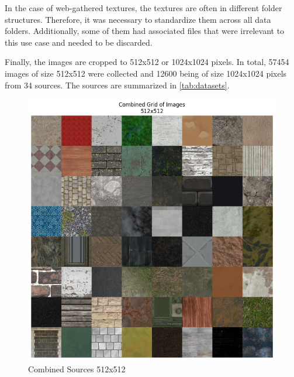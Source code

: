     In the case of web-gathered textures, the textures are often in different folder structures. Therefore, it was necessary to standardize them across all data folders. Additionally, some of them had associated files that were irrelevant to this use case and needed to be discarded.

    Finally, the images are cropped to 512x512 or 1024x1024 pixels. In total, 57454 images of size 512x512 were collected and 12600 being of size 1024x1024 pixels from 34 sources. The sources are summarized in \autoref{tab:datasets}.


    \begin{figure}[H]
        \centering
        \begin{minipage}{.50\textwidth}
            \centering
            \includegraphics[width=\linewidth]{../code/dataAnalysis/plots/exampleImgs/DataCombined512x.png}
            \caption{Combined Sources 512x512}
            \label{fig:exmapleImgs512}
        \end{minipage}\hfill
        \begin{minipage}{.50\textwidth}
            \centering

\end{minipage}
\end{figure}
